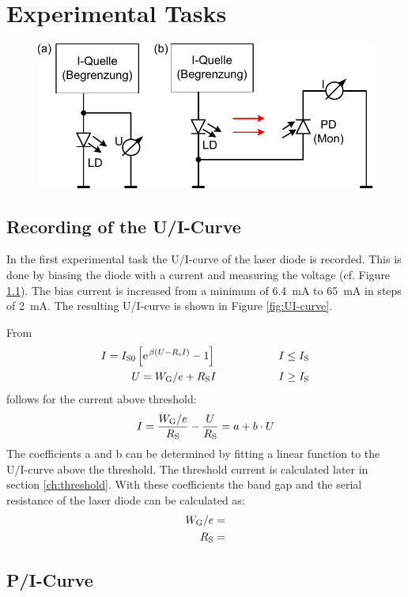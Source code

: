  \chapter{Experimental Tasks}

\begin{figure}[ht]
\centering
\includegraphics[width=.6\columnwidth]{Grafiken/measurement1.pdf}%
\caption{}%
\label{fig:measurement1}%
\end{figure}


\section{Recording of the U/I-Curve}



 In the first experimental task the U/I-curve of the laser diode is recorded. This is done by biasing the diode with a current and measuring the voltage (cf. Figure \ref{fig:measurement1}). The bias current is increased from a minimum of 6.4~mA to 65~mA in steps of 2~mA. The resulting U/I-curve is shown in Figure \ref{fig:UI-curve}.

From
\begin{equation}
 \begin{split}
I = I\i{S0}\left[\e^{\beta\left(U-R\i{s}I\right)}-1\right] \hspace{2cm} I\leq I\i{S}\\
U = W\i{G}/e +R\i{S}I \hspace{2cm} I\geq I\i{S}\\
 \end{split}
\end{equation}
follows for the current above threshold:
\begin{equation}
 I = \frac{W_{\mathrm{G}}/e}{R_{\mathrm{S}}}-\frac{U}{R_{\mathrm{S}}} = a + b\cdot U
\end{equation}
The coefficients a and b can be determined by fitting a linear function to the U/I-curve above the threshold. The threshold current is calculated later in section \ref{ch:threshold}.  With these coefficients the band gap and the serial resistance of the laser diode can be calculated as:
\begin{equation}
\begin{split}
 W_{\mathrm{G}}/e=\\
 R_{\mathrm{S}} = 
\end{split}
\end{equation}


\section{P/I-Curve}
   